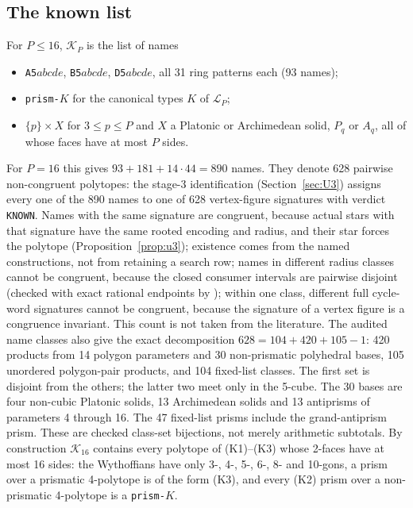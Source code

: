 \documentclass[11pt]{article}
\theoremstyle{definition}
\theoremstyle{remark}
\newcommand{\file}[1]{\path{#1}}
\begin{document}
\subsection{The known list}\label{sec:knownlist}

For $P\le 16$, $\mathcal K_P$ is the list of names
\begin{itemize}[leftmargin=2em]
\item \texttt{A5}$abcde$, \texttt{B5}$abcde$, \texttt{D5}$abcde$, all 31 ring
  patterns each (93 names);
\item \texttt{prism-}$K$ for the canonical types $K$ of $\mathcal L_P$;
\item $\{p\}\times X$ for $3\le p\le P$ and $X$ a Platonic or Archimedean
  solid, $P_q$ or $A_q$, all of whose faces have at most $P$ sides.
\end{itemize}
For $P=16$ this gives $93+181+14\cdot44=890$ names. They denote 628
pairwise non-congruent polytopes: the stage-3 identification
(Section~\ref{sec:U3}) assigns every one of the 890 names to one of 628
vertex-figure signatures with verdict \texttt{KNOWN}. Names with the same
signature are congruent, because actual stars with that signature have
the same rooted encoding and radius, and their star forces the polytope
(Proposition~\ref{prop:u3}); existence comes from the named constructions,
not from retaining a search row;
names in different radius classes cannot be congruent, because the
closed consumer intervals are pairwise disjoint (checked with exact
rational endpoints by \file{checks/check_filter.py}); within one class,
different full cycle-word signatures cannot be congruent, because the
signature of a vertex figure is a congruence invariant. This count is not taken from the
literature. The audited name classes also give the exact decomposition
$628=104+420+105-1$: 420 products from 14 polygon parameters and 30
non-prismatic polyhedral bases, 105 unordered polygon-pair products, and
104 fixed-list classes. The first set is disjoint from the others; the
latter two meet only in the 5-cube. The 30 bases are four non-cubic
Platonic solids, 13 Archimedean solids and 13 antiprisms of parameters
4 through 16. The 47 fixed-list prisms include the grand-antiprism prism.
These are checked class-set bijections, not merely arithmetic subtotals. By construction $\mathcal K_{16}$ contains every
polytope of (K1)--(K3) whose 2-faces have at most 16 sides: the
Wythoffians have only 3-, 4-, 5-, 6-, 8- and 10-gons, a prism over a
prismatic 4-polytope is of the form (K3), and every (K2) prism over a
non-prismatic 4-polytope is a \texttt{prism-}$K$.
\end{document}
